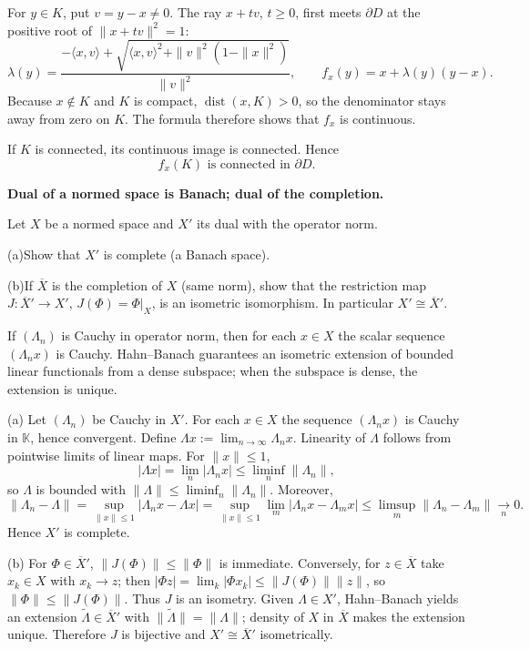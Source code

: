 \begin{solution}
For \(y\in K\), put \(v=y-x\neq0\). The ray \(x+tv\), \(t\ge0\), first meets
\(\partial D\) at the positive root of \(\|x+tv\|^2=1\):
\[
\lambda(y)=
\frac{-\langle x,v\rangle+
\sqrt{\langle x,v\rangle^2+\|v\|^2(1-\|x\|^2)}}{\|v\|^2},
\qquad
f_x(y)=x+\lambda(y)(y-x).
\]
Because \(x\notin K\) and \(K\) is compact, \(\operatorname{dist}(x,K)>0\), so the
denominator stays away from zero on \(K\). The formula therefore shows that \(f_x\)
is continuous.

If \(K\) is connected, its continuous image is connected. Hence
\[
\boxed{f_x(K)\text{ is connected in }\partial D.}
\]
\end{solution}

\begin{problem}[CP-II-0070]
\label{prob:cp-ii-0070}
\textbf{Dual of a normed space is Banach; dual of the completion.}

\hspace*{1.5em}Let $X$ be a normed space and $X'$ its dual with the operator norm.

		\par\noindent (a)\quad Show that $X'$ is complete (a Banach space).
		\par\noindent (b)\quad If $\overline{X}$ is the completion of $X$ (same norm), show that the restriction map
		$J:\overline{X}'\to X'$, $J(\Phi)=\Phi|_X$, is an isometric isomorphism. In particular $X'\cong \overline{X}'$.

	If $(\Lambda_n)$ is Cauchy in operator norm, then for each $x\in X$ the scalar sequence $(\Lambda_n x)$ is Cauchy.
	Hahn--Banach guarantees an isometric extension of bounded linear functionals from a dense subspace; when the subspace is dense, the extension is unique.
\end{problem}

\begin{solution}
(a) Let $(\Lambda_n)$ be Cauchy in $X'$. For each $x\in X$ the sequence $(\Lambda_n x)$ is Cauchy in $\mathbb K$, hence convergent. Define $\Lambda x:=\lim_{n\to\infty}\Lambda_n x$. Linearity of $\Lambda$ follows from pointwise limits of linear maps. For $\|x\|\le 1$,
	\[
	|\Lambda x|=\lim_{n}|\Lambda_n x|\le \liminf_{n}\|\Lambda_n\|,
	\]
	so $\Lambda$ is bounded with $\|\Lambda\|\le \liminf_n \|\Lambda_n\|$. Moreover,
	\[
	\|\Lambda_n-\Lambda\|
	=\sup_{\|x\|\le 1} |\Lambda_n x-\Lambda x|
	=\sup_{\|x\|\le 1}\lim_{m} |\Lambda_n x-\Lambda_m x|
	\le \limsup_{m}\|\Lambda_n-\Lambda_m\|\xrightarrow[n]{}0.
	\]
	Hence $X'$ is complete.

	\smallskip
	(b) For $\Phi\in\overline{X}'$, $\|J(\Phi)\|\le \|\Phi\|$ is immediate. Conversely, for $z\in\overline{X}$ take $x_k\in X$ with $x_k\to z$; then
	$|\Phi z|=\lim_k |\Phi x_k| \le \|J(\Phi)\|\|z\|$, so $\|\Phi\|\le \|J(\Phi)\|$. Thus $J$ is an isometry.
	Given $\Lambda\in X'$, Hahn--Banach yields an extension $\widetilde\Lambda\in\overline{X}'$ with $\|\widetilde\Lambda\|=\|\Lambda\|$; density of $X$ in $\overline{X}$ makes the extension unique. Therefore $J$ is bijective and $X'\cong \overline{X}'$ isometrically.

	\bigskip
\end{solution}


